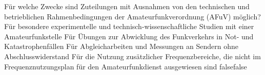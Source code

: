     {Für welche Zwecke sind Zuteilungen mit Ausnahmen von den technischen und betrieblichen Rahmenbedingungen der Amateurfunkverordnung (AFuV) möglich?}
    {Für besondere experimentelle und technisch-wissenschaftliche Studien mit einer Amateurfunkstelle}
    {Für Übungen zur Abwicklung des Funkverkehrs in Not- und Katastrophenfällen}
    {Für Abgleicharbeiten und Messungen an Sendern ohne Abschlusswiderstand}
    {Für die Nutzung zusätzlicher Frequenzbereiche, die nicht im Frequenznutzungsplan für den Amateurfunkdienst ausgewiesen sind}
    {false}{false}